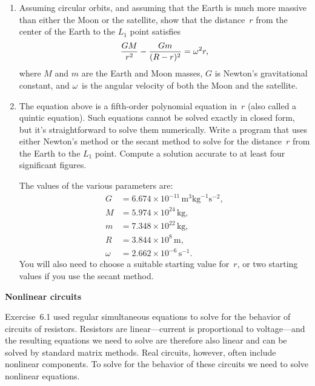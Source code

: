 \documentclass[12pt]{article}
\begin{document}
\begin{exercises}
\begin{enumerate}\setlength{\itemsep}{0pt}
\item Assuming circular orbits, and assuming that the Earth is much more
  massive than either the Moon or the satellite, show that the distance~$r$
  from the center of the Earth to the $L_1$ point satisfies
\begin{displaymath}
{GM\over r^2} - {Gm\over(R-r)^2} = \omega^2 r,
\end{displaymath}
where $M$ and $m$ are the Earth and Moon masses, $G$ is Newton's
gravitational constant, and $\omega$~is the angular velocity of both the
Moon and the satellite.
\item The equation above is a fifth-order polynomial equation in~$r$ (also
  called a quintic equation).  Such equations cannot be solved exactly in
  closed form, but it's straightforward to solve them numerically.  Write a
  program that uses either Newton's method or the secant method to solve
  for the distance~$r$ from the Earth to the $L_1$ point.  Compute a
  solution accurate to at least four significant figures.

  The values of the various parameters are:
\begin{align*}
G &= 6.674\times10^{-11}\,\mathrm{m}^3\mathrm{kg}^{-1}\mathrm{s}^{-2}, \\
M &= 5.974\times10^{24}\,\mathrm{kg}, \\
m &= 7.348\times10^{22}\,\mathrm{kg}, \\
R &= 3.844\times10^8\,\mathrm{m}, \\
\omega &= 2.662\times10^{-6}\,\mathrm{s}^{-1}.
\end{align*}
You will also need to choose a suitable starting value for~$r$, or two
starting values if you use the secant method.
\end{enumerate}



\exercise \textbf{Nonlinear circuits}

\exskip Exercise~6.1 used regular simultaneous equations to solve for the
behavior of circuits of resistors.  Resistors are linear---current is
proportional to voltage---and the resulting equations we need to solve are
therefore also linear and can be solved by standard matrix methods.  Real
circuits, however, often include nonlinear components.  To solve for the
behavior of these circuits we need to solve nonlinear equations.


\end{exercises}
\end{document}
